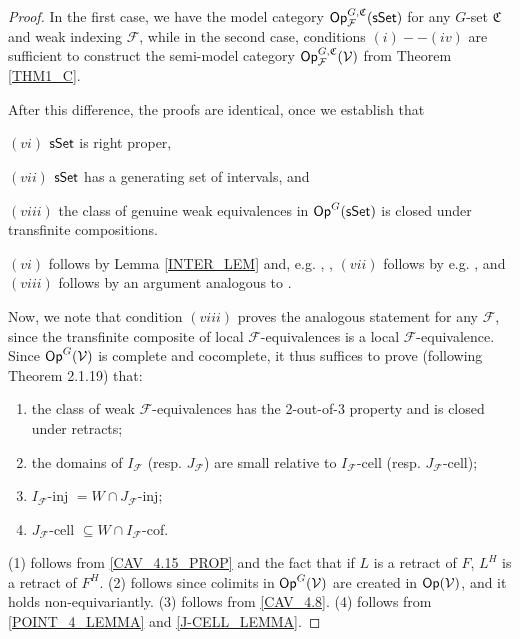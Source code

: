 \documentclass[a4paper,10pt
,draft
]{article}%
\renewcommand{\F}{\mathcal F}
\renewcommand{\1}{\ensuremath{\mathbb{id}}}
\begin{document}
\begin{proof}
      In the first case, we have the model category $\Op^{G,\mathfrak C}_\F(\sSet)$
      for any $G$-set $\mathfrak C$ and weak indexing $\F$,
      while in the second case, conditions $(i) -- (iv)$ are sufficient to construct the
      semi-model category $\Op^{G, \mathfrak C}_\F(\V)$ from Theorem \ref{THM1_C}. 
      
      After this difference, the proofs are identical,
      once we establish that
      \begin{enumerate*}
      \item[$(vi)$] $\mathsf{sSet}$ is right proper,
      \item[$(vii)$] $\mathsf{sSet}$ has a generating set of intervals, and
      \item[$(viii)$] the class of genuine weak equivalences in $\mathsf{Op}^G(\mathsf{sSet})$ is closed under transfinite compositions.
      \end{enumerate*}
      $(vi)$ follows by Lemma \ref{INTER_LEM} and, e.g. \cite[Prop 2.1.5]{Cis06}, \cite[Lemma 1.12]{BM13},
      $(vii)$ follows by e.g. \cite[Lemma 1.12]{BM13}, and
      $(viii)$ follows by an argument analogous to \cite[Lemma 1.24]{CM13b}.

      Now, we note that condition $(viii)$ proves the analogous statement for any $\F$,
      since the transfinite composite of local $\F$-equivalences is a local $\F$-equivalence.
      Since $\mathsf{Op}^G(\mathcal V)$ is complete and cocomplete, it thus suffices to prove (following \cite{Hov98} Theorem 2.1.19) that:
      \begin{enumerate}[label = (\arabic*)]
      \item the class of weak $\F$-equivalences has the 2-out-of-3 property and is closed under retracts;
      \item the domains of $I_{\F}$ (resp. $J_{\F}$) are small relative to $I_{\F}$-cell (resp. $J_{\F}$-cell);
      \item $I_{\F}$-inj $= W\cap J_{\F}$-inj;
      \item $J_{\F}$-cell $\subseteq W\cap I_{\F}$-cof.
      \end{enumerate}
      (1) follows from \ref{CAV_4.15_PROP} and the fact that if $L$ is a retract of $F$, $L^H$ is a retract of $F^H$.
      (2) follows since colimits in $\mathsf{Op}^G(\mathcal V)$ are created in $\mathsf{Op}(\mathcal V)$, and it holds non-equivariantly.
      (3) follows from \ref{CAV_4.8}.
      (4) follows from \ref{POINT_4_LEMMA} and \ref{J-CELL_LEMMA}.
\end{proof}
\end{document}
